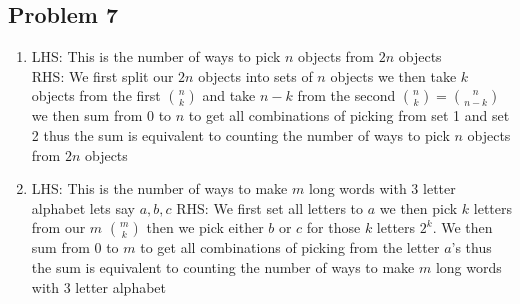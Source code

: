 \documentclass[12pt, letterpaper]{article}
\theoremstyle{definition}
\begin{document}
\newpage
\subsection*{Problem 7}
\begin{enumerate}
    \item LHS: This is the number of ways to pick $n$ objects from $2n$ objects\\
    RHS: We first split our $2n$ objects into sets of $n$ objects we then take $k$ objects from the first $\binom{n}{k}$ and take $n-k$ from the second $\binom{n}{k}=\binom{n}{n-k}$
    we then sum from 0 to $n$ to get all combinations of picking from set 1 and set 2 thus the sum is equivalent to counting the number of ways to pick $n$ objects from $2n$ objects
    \item LHS: This is the number of ways to make $m$ long words with $3$ letter alphabet lets say $a,b,c$
    RHS: We first set all letters to $a$ we then pick $k$ letters from our $m$ $\binom{m}{k}$ then we pick either $b$ or $c$ for those $k$ letters $2^k$.
    We then sum from 0 to $m$ to get all combinations of picking from the letter $a$'s thus the sum is equivalent to counting the number of ways to make $m$ long words with 3 letter alphabet
\end{enumerate}

\newpage
\end{document}
